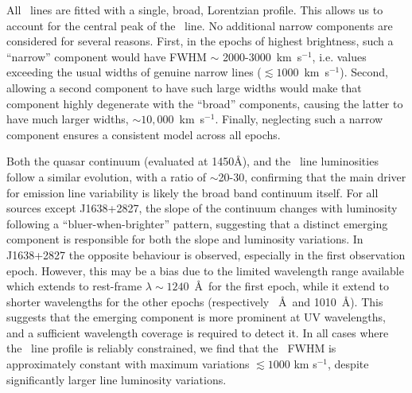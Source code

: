 \documentclass[fleqn,usenatbib]{mnras}
\begin{document}
All \civ\ lines are fitted with a single, broad, Lorentzian profile.
This allows us to account for the central peak of the \civ\ line.  No
additional narrow components are considered for several reasons.
First, in the epochs of highest brightness, such a ``narrow''
component would have FWHM $\sim$ 2000-3000~km~s$^{-1}$, i.e. values
exceeding the usual widths of genuine narrow lines ($\lesssim
1000$~km~s$^{-1}$). Second, allowing a second component to have such
large widths would make that component highly degenerate with the
``broad'' components, causing the latter to have much larger widths,
$\sim 10,000$~km~s$^{-1}$.  Finally, neglecting such a narrow
component ensures a consistent model across all epochs.

Both the quasar continuum (evaluated at 1450\AA), and the \civ\ line
luminosities follow a similar evolution, with a ratio of $\sim$20-30,
confirming that the main driver for emission line variability is
likely the broad band continuum itself.  For all sources except
J1638+2827, the slope of the continuum changes with luminosity
following a ``bluer-when-brighter'' pattern, suggesting that a
distinct emerging component is responsible for both the slope and
luminosity variations.  In J1638+2827 the opposite behaviour is
observed, especially in the first observation epoch.  However, this
may be a bias due to the limited wavelength range available which
extends to rest-frame $\lambda \sim 1240$~\AA\ for the first epoch,
while it extend to shorter wavelengths for the other epochs
(respectively ~\AA\ and 1010~\AA).  This suggests that the emerging
component is more prominent at UV wavelengths, and a sufficient
wavelength coverage is required to detect it. In all cases where the
\civ\ line profile is reliably constrained, we find that the \civ\
FWHM is approximately constant with maximum variations $\lesssim 1000$
km s$^{-1}$, despite significantly larger line luminosity variations.
\end{document}
